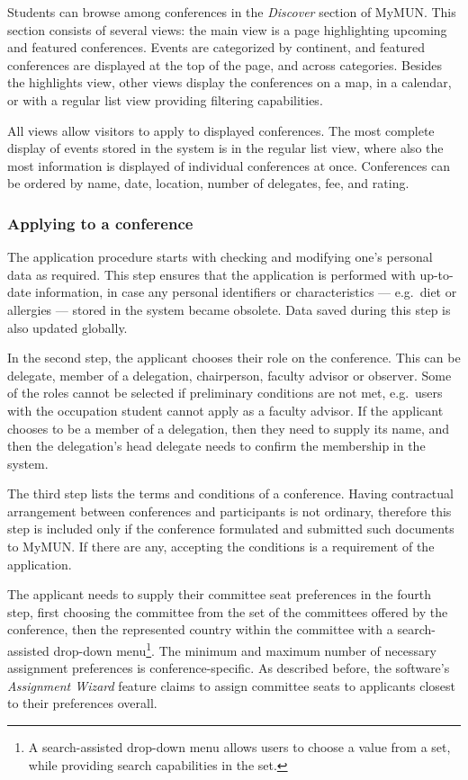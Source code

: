 Students can browse among conferences in the \emph{Discover} section of MyMUN. This section consists of several views: the main view is a page highlighting upcoming and featured conferences. Events are categorized by continent, and featured conferences are displayed at the top of the page, and across categories. Besides the highlights view, other views display the conferences on a map, in a calendar, or with a regular list view providing filtering capabilities.

All views allow visitors to apply to displayed conferences. The most complete display of events stored in the system is in the regular list view, where also the most information is displayed of individual conferences at once. Conferences can be ordered by name, date, location, number of delegates, fee, and rating.

\subsubsection{Applying to a conference}

The application procedure starts with checking and modifying one's personal data as required. This step ensures that the application is performed with up-to-date information, in case any personal identifiers or characteristics — e.g.\ diet or allergies — stored in the system became obsolete. Data saved during this step is also updated globally.

In the second step, the applicant chooses their role on the conference. This can be delegate, member of a delegation, chairperson, faculty advisor or observer. Some of the roles cannot be selected if preliminary conditions are not met, e.g.\ users with the occupation student cannot apply as a faculty advisor. If the applicant chooses to be a member of a delegation, then they need to supply its name, and then the delegation's head delegate needs to confirm the membership in the system.

The third step lists the terms and conditions of a conference. Having contractual arrangement between conferences and participants is not ordinary, therefore this step is included only if the conference formulated and submitted such documents to MyMUN. If there are any, accepting the conditions is a requirement of the application.

The applicant needs to supply their committee seat preferences in the fourth step, first choosing the committee from the set of the committees offered by the conference, then the represented country within the committee with a search-assisted drop-down menu\footnote{A search-assisted drop-down menu allows users to choose a value from a set, while providing search capabilities in the set.}. The minimum and maximum number of necessary assignment preferences is conference-specific. As described before, the software's \emph{Assignment Wizard} feature claims to assign committee seats to applicants closest to their preferences overall.

